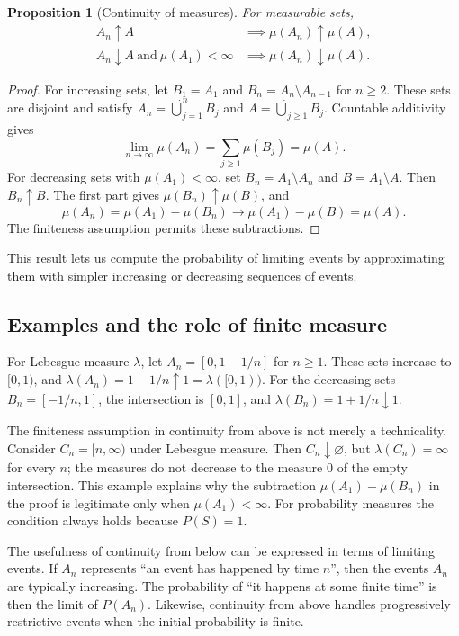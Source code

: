 \documentclass[10pt,a4paper]{article}
\newtheorem{proposition}{Proposition}
\begin{document}
\begin{proposition}[Continuity of measures]
For measurable sets, 
\begin{align*}
A_n\uparrow A&\implies\mu(A_n)\uparrow\mu(A),\\
A_n\downarrow A\ \text{and}\ \mu(A_1)<\infty
&\implies\mu(A_n)\downarrow\mu(A).
\end{align*}
\end{proposition}
\begin{proof}
For increasing sets, let $B_1=A_1$ and $B_n=A_n\setminus A_{n-1}$ for $n\ge2$. These sets are disjoint and satisfy $A_n=\dot\bigcup_{j=1}^n B_j$ and $A=\dot\bigcup_{j\ge1}B_j$. Countable additivity gives
\[
\lim_{n\to\infty}\mu(A_n)=\sum_{j\ge1}\mu(B_j)=\mu(A).
\]
For decreasing sets with $\mu(A_1)<\infty$, set $B_n=A_1\setminus A_n$ and $B=A_1\setminus A$. Then $B_n\uparrow B$. The first part gives $\mu(B_n)\uparrow\mu(B)$, and
\[
\mu(A_n)=\mu(A_1)-\mu(B_n)\longrightarrow
\mu(A_1)-\mu(B)=\mu(A).
\]
The finiteness assumption permits these subtractions.
\end{proof}
This result lets us compute the probability of limiting events by approximating them with simpler increasing or decreasing sequences of events.


\subsection*{Examples and the role of finite measure}
For Lebesgue measure $\lambda$, let $A_n=[0,1-1/n]$ for $n\ge1$. These sets increase to $[0,1)$, and $\lambda(A_n)=1-1/n\uparrow1=\lambda([0,1))$. For the decreasing sets $B_n=[-1/n,1]$, the intersection is $[0,1]$, and $\lambda(B_n)=1+1/n\downarrow1$.

The finiteness assumption in continuity from above is not merely a technicality. Consider $C_n=[n,\infty)$ under Lebesgue measure. Then $C_n\downarrow\varnothing$, but $\lambda(C_n)=\infty$ for every $n$; the measures do not decrease to the measure $0$ of the empty intersection. This example explains why the subtraction $\mu(A_1)-\mu(B_n)$ in the proof is legitimate only when $\mu(A_1)<\infty$. For probability measures the condition always holds because $P(S)=1$.

The usefulness of continuity from below can be expressed in terms of limiting events. If $A_n$ represents ``an event has happened by time $n$'', then the events $A_n$ are typically increasing. The probability of ``it happens at some finite time'' is then the limit of $P(A_n)$. Likewise, continuity from above handles progressively restrictive events when the initial probability is finite.
\end{document}
